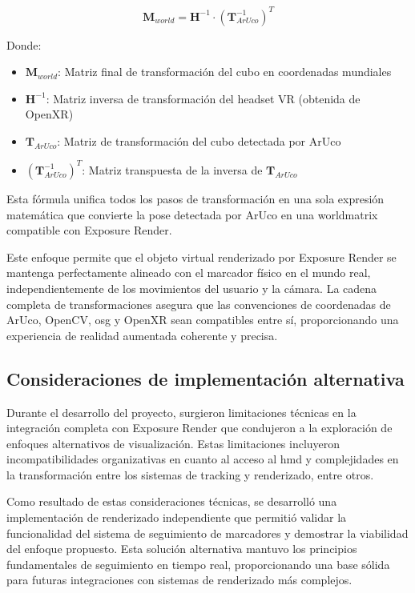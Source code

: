 $$\mathbf{M}_{world} = \mathbf{H}^{-1} \cdot (\mathbf{T}_{ArUco}^{-1})^T$$

Donde:
\begin{itemize}
    \item $\mathbf{M}_{world}$: Matriz final de transformación del cubo en coordenadas mundiales
    \item $\mathbf{H}^{-1}$: Matriz inversa de transformación del headset VR (obtenida de OpenXR)
    \item $\mathbf{T}_{ArUco}$: Matriz de transformación del cubo detectada por ArUco
    \item $(\mathbf{T}_{ArUco}^{-1})^T$: Matriz transpuesta de la inversa de $\mathbf{T}_{ArUco}$
\end{itemize}

Esta fórmula unifica todos los pasos de transformación en una sola expresión matemática que convierte la \gls{pose} detectada por ArUco en una \gls{worldmatrix} compatible con Exposure Render.

Este enfoque permite que el objeto virtual renderizado por Exposure Render se mantenga perfectamente alineado con el marcador físico en el mundo real, independientemente de los movimientos del usuario y la cámara. La cadena completa de transformaciones asegura que las convenciones de coordenadas de ArUco, OpenCV, \acrshort{osg} y OpenXR sean compatibles entre sí, proporcionando una experiencia de realidad aumentada coherente y precisa.

\subsection{Consideraciones de implementación alternativa}

Durante el desarrollo del proyecto, surgieron limitaciones técnicas en la integración completa con Exposure Render que condujeron a la exploración de enfoques alternativos de visualización. Estas limitaciones incluyeron incompatibilidades organizativas en cuanto al acceso al \acrshort{hmd} y complejidades en la transformación entre los sistemas de \gls{tracking} y renderizado, entre otros.

Como resultado de estas consideraciones técnicas, se desarrolló una implementación de renderizado independiente que permitió validar la funcionalidad del sistema de seguimiento de marcadores y demostrar la viabilidad del enfoque propuesto. Esta solución alternativa mantuvo los principios fundamentales de seguimiento en tiempo real, proporcionando una base sólida para futuras integraciones con sistemas de renderizado más complejos.

